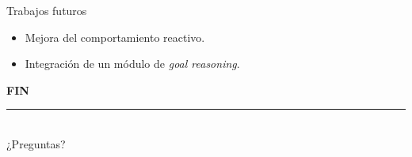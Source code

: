 \documentclass[11pt]{beamer}    %
\begin{document}
    \begin{frame}{Trabajos futuros}
        \begin{itemize}
            \item Mejora del comportamiento reactivo.
            \item Integración de un módulo de \textit{goal reasoning}.
        \end{itemize}
    \end{frame}

    \begin{frame}[standout]
        \textbf{{\Huge FIN}}
        \noindent\rule[-1ex]{\textwidth}{1.5pt}\\[3.5ex]
        ¿Preguntas?
    \end{frame}
\end{document}
